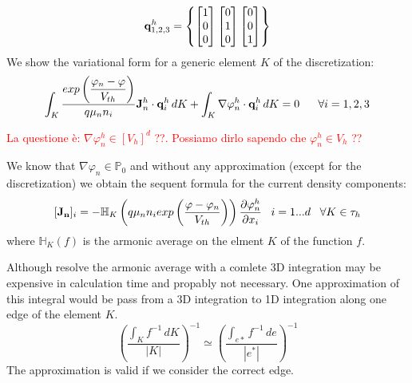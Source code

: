 \begin{equation}
\label{eq: form of qh}
\mathbf{q}^h_{1,2,3} = \left\{ \begin{bmatrix} 1 \\ 0 \\ 0 \end{bmatrix}  \begin{bmatrix} 0 \\ 1 \\ 0 \end{bmatrix}  \begin{bmatrix} 0 \\ 0 \\ 1 \end{bmatrix}  \right\}
\end{equation}
We show the variational form for a generic element $K$ of the discretization:
\begin{equation}
\label{eq: variation form of current density}
\int_K \dfrac{ exp \left( \dfrac{\varphi_n-\varphi}{V_{th}} \right) }{q \mu_n n_i} \vect{J}_n^h \cdot \vect{q}^h_i \, dK
 + \int_K \nabla \varphi_n^h \cdot \vect{q}^h_i \, dK = 0 \psp{10} \forall i=1,2,3
\end{equation}

\textcolor{red}{La questione \`e: $\nabla \varphi_n^h \in \left[ V_h \right]^d$ ??. Possiamo dirlo sapendo che $\varphi_n^h \in V_h$ ??}

We know that $\nabla \varphi_n \in \mathbb{P}_0$ and without any approximation (except for the discretization) we obtain the sequent formula for the current density components:
\begin{equation}
\label{eq: first formula for J}
[\vect{J_n}]_i = - \mathbb{H}_K \left( q \mu_n n_i exp \left( \dfrac{\varphi-\varphi_n}{V_{th}} \right)  \right) \dfrac{\partial \varphi_n^h}{\partial x_i} \psp{5} i = 1...d \psp{5} \forall K \in \tau_h
\end{equation}
where $\mathbb{H}_K(f)$ is the armonic average on the elment $K$ of the function $f$.

Although resolve the armonic average with a comlete 3D integration may be expensive in calculation time and propably not necessary. One approximation of this integral would be pass from a 3D integration to 1D integration along one edge of the element $K$.
\begin{equation}
\label{eq: approzimation from 3D to edge}
\left(\dfrac{\int_K f^{-1} \, dK}{|K|} \right)^{-1} \simeq \left(\dfrac{\int_{e*} f^{-1} \, de}{|e^*|} \right)^{-1}
\end{equation}
  The approximation  is valid if we consider the correct edge.


